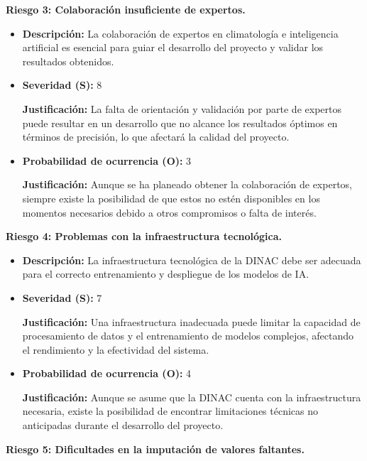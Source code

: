\documentclass[
11pt, %
codirector, %
]{charter}
\begin{document}
\textbf{Riesgo 3: Colaboración insuficiente de expertos.}

\begin{itemize}
  \item \textbf{Descripción:} La colaboración de expertos en climatología e inteligencia artificial es esencial para guiar el desarrollo del proyecto y validar los resultados obtenidos.
  \item \textbf{Severidad (S):} 8
  
  \textbf{Justificación:} La falta de orientación y validación por parte de expertos puede resultar en un desarrollo que no alcance los resultados óptimos en términos de precisión, lo que afectará la calidad del proyecto.
  \item \textbf{Probabilidad de ocurrencia (O):} 3
  
  \textbf{Justificación:} Aunque se ha planeado obtener la colaboración de expertos, siempre existe la posibilidad de que estos no estén disponibles en los momentos necesarios debido a otros compromisos o falta de interés.
\end{itemize}

\textbf{Riesgo 4: Problemas con la infraestructura tecnológica.}

\begin{itemize}
  \item \textbf{Descripción:} La infraestructura tecnológica de la DINAC debe ser adecuada para el correcto entrenamiento y despliegue de los modelos de IA.
  \item \textbf{Severidad (S):} 7
  
  \textbf{Justificación:} Una infraestructura inadecuada puede limitar la capacidad de procesamiento de datos y el entrenamiento de modelos complejos, afectando el rendimiento y la efectividad del sistema.
  \item \textbf{Probabilidad de ocurrencia (O):} 4
  
  \textbf{Justificación:} Aunque se asume que la DINAC cuenta con la infraestructura necesaria, existe la posibilidad de encontrar limitaciones técnicas no anticipadas durante el desarrollo del proyecto.
\end{itemize}

\textbf{Riesgo 5: Dificultades en la imputación de valores faltantes.}
\end{document}
